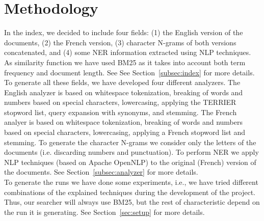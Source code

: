 \section{Methodology}\label{sec:methodology}
In the index, we decided to include four fields: (1) the English version of the documents, (2) the French version, (3)
character N-grams of both versions concatenated, and (4) some NER information extracted using NLP techniques.
As similarity function we have used BM25 as it takes into account both term frequency and document length.
See See Section~\ref{subsec:index} for more details.\\
To generate all these fields, we have developed four different analyzers.
The English analyzer is based on whitespace tokenization, breaking of words and numbers based on special characters,
lowercasing, applying the TERRIER stopword list, query expansion with synonyms, and stemming.
The French analyer is based on whitespace tokenization, breaking of words and numbers based on special characters,
lowercasing, applying a French stopword list and stemming.
To generate the character N-grams we consider only the letters of the documents (i.e. discarding numbers and
punctuation).
To perform NER we apply NLP techniques (based on Apache OpenNLP\cite{ApacheOpenNLP}) to the original (French) version of
the documents.
See Section~\ref{subsec:analyzer} for more details.\\
To generate the runs we have done some experiments, i.e., we have tried different combinations of the explained
techniques during the development of the project.
Thus, our searcher will always use BM25, but the rest of characteristic depend on the run it is generating.
See Section~\ref{sec:setup} for more details.